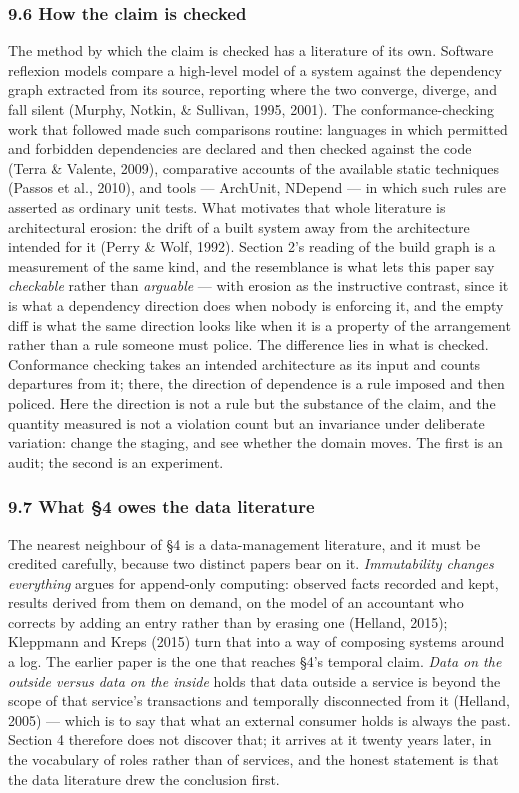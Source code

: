 \documentclass[
]{article}
\begin{document}
\subsubsection{9.6 How the claim is
checked}\label{how-the-claim-is-checked}

The method by which the claim is checked has a literature of its own.
Software reflexion models compare a high-level model of a system against
the dependency graph extracted from its source, reporting where the two
converge, diverge, and fall silent (Murphy, Notkin, \& Sullivan, 1995,
2001). The conformance-checking work that followed made such comparisons
routine: languages in which permitted and forbidden dependencies are
declared and then checked against the code (Terra \& Valente, 2009),
comparative accounts of the available static techniques (Passos et al.,
2010), and tools --- ArchUnit, NDepend --- in which such rules are
asserted as ordinary unit tests. What motivates that whole literature is
architectural erosion: the drift of a built system away from the
architecture intended for it (Perry \& Wolf, 1992). Section 2's reading
of the build graph is a measurement of the same kind, and the
resemblance is what lets this paper say \emph{checkable} rather than
\emph{arguable} --- with erosion as the instructive contrast, since it
is what a dependency direction does when nobody is enforcing it, and the
empty diff is what the same direction looks like when it is a property
of the arrangement rather than a rule someone must police. The
difference lies in what is checked. Conformance checking takes an
intended architecture as its input and counts departures from it; there,
the direction of dependence is a rule imposed and then policed. Here the
direction is not a rule but the substance of the claim, and the quantity
measured is not a violation count but an invariance under deliberate
variation: change the staging, and see whether the domain moves. The
first is an audit; the second is an experiment.

\subsubsection{9.7 What §4 owes the data
literature}\label{what-4-owes-the-data-literature}

The nearest neighbour of §4 is a data-management literature, and it must
be credited carefully, because two distinct papers bear on it.
\emph{Immutability changes everything} argues for append-only computing:
observed facts recorded and kept, results derived from them on demand,
on the model of an accountant who corrects by adding an entry rather
than by erasing one (Helland, 2015); Kleppmann and Kreps (2015) turn
that into a way of composing systems around a log. The earlier paper is
the one that reaches §4's temporal claim. \emph{Data on the outside
versus data on the inside} holds that data outside a service is beyond
the scope of that service's transactions and temporally disconnected
from it (Helland, 2005) --- which is to say that what an external
consumer holds is always the past. Section 4 therefore does not discover
that; it arrives at it twenty years later, in the vocabulary of roles
rather than of services, and the honest statement is that the data
literature drew the conclusion first.
\end{document}
